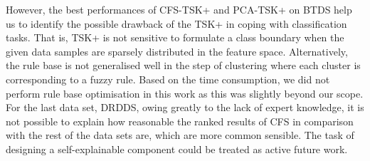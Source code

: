 \documentclass{article}
\newcommand*{\1}{\textcolor{magenta}}
\begin{document}
	However, the best performances of CFS-TSK+ and PCA-TSK+ on BTDS help us to identify the possible drawback of the TSK+ in coping with classification tasks. That is, TSK+ is not sensitive to formulate a class boundary when the given data samples are sparsely distributed in the feature space. Alternatively, the rule base is not generalised well in the step of clustering where each cluster is corresponding to a fuzzy rule. Based on the time consumption, we did not perform rule base optimisation in this work as this was slightly beyond our scope. For the last data set, DRDDS, owing greatly to the lack of expert knowledge, it is not possible to explain how reasonable the ranked results of CFS in comparison with the rest of the data sets are, which are more common sensible. The task of designing a self-explainable component could be treated as active future work.
	
	
\end{document}
